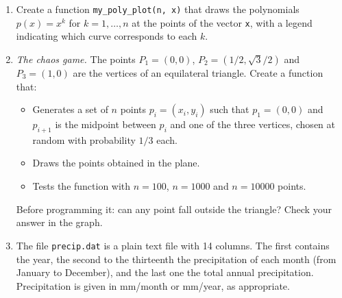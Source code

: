 \begin{enumerate}
\item Create a function \texttt{my\_poly\_plot(n, x)} that draws the polynomials $p(x)=x^k$ for $k=1,\ldots,n$ at the points of the vector \texttt{x}, with a legend indicating which curve corresponds to each $k$.

\item \emph{The chaos game.} The points $P_1=(0,0)$, $P_2=(1/2,\sqrt{3}/2)$ and $P_3=(1,0)$ are the vertices of an equilateral triangle. Create a function that:
\begin{itemize}
    \item Generates a set of $n$ points $p_i=(x_i,y_i)$ such that $p_1=(0,0)$ and $p_{i+1}$ is the midpoint between $p_i$ and one of the three vertices, chosen at random with probability $1/3$ each.
    \item Draws the points obtained in the plane.
    \item Tests the function with $n=100$, $n=1000$ and $n=10000$ points.
\end{itemize}
Before programming it: can any point fall outside the triangle? Check your answer in the graph.

\item\label{ej:precip-en} The file \texttt{precip.dat} is a plain text file with 14 columns. The first contains the year, the second to the thirteenth the precipitation of each month (from January to December), and the last one the total annual precipitation. Precipitation is given in mm/month or mm/year, as appropriate.


\end{enumerate}
